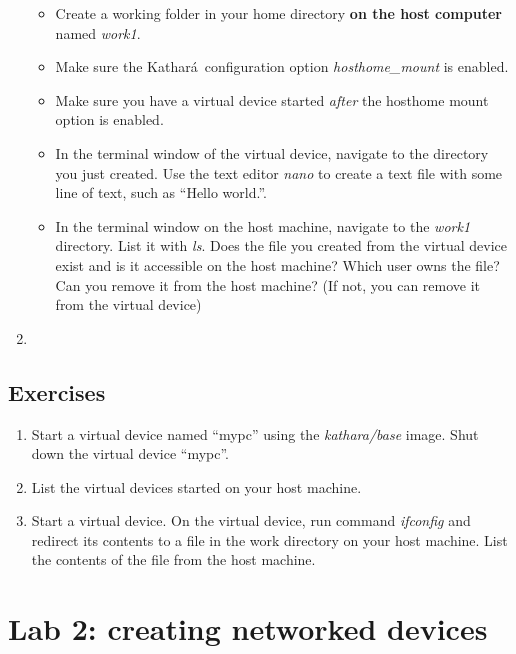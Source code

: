 \documentclass[12pt]{book}
\newcommand{\kathara}{Kathar\'a}
\begin{document}
\begin{enumerate}[{Activity }1)]
  \begin{itemize}[--]
  \item Create a working folder in your home directory \textbf{on the host computer} named \emph{work1}.
  \item Make sure the \kathara\ configuration option \emph{hosthome\_mount} is enabled.
  \item Make sure you have a virtual device started \emph{after} the hosthome mount option is enabled.
  \item In the terminal window of the virtual device, navigate to the directory you just created. Use the text editor \emph{nano} to create a text file with some line of text, such as ``Hello world.''.
  \item In the terminal window on the host machine, navigate to the \emph{work1} directory. List it with \emph{ls}. Does the file you created from the virtual device exist and is it accessible on the host machine? Which user owns the file? Can you remove it from the host machine? (If not, you can remove it from the virtual device)
  \end{itemize}

\item

\end{enumerate}

\section{Exercises}

\begin{enumerate}[1.]
\item Start a virtual device named ``mypc'' using the \emph{kathara/base} image. Shut down the virtual device ``mypc''.
\item List the virtual devices started on your host machine.
\item Start a virtual device. On the virtual device, run command \emph{ifconfig} and redirect its contents to a file in the work directory on your host machine. List the contents of the file from the host machine.
\end{enumerate}


\chapter{Lab 2: creating networked devices}
\end{document}
